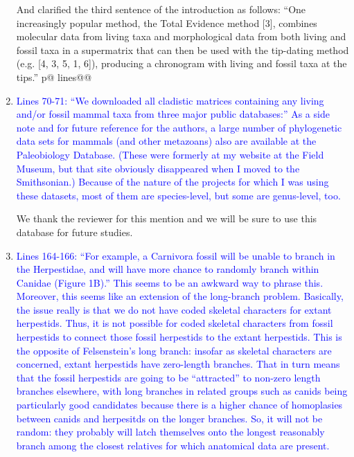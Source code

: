 \documentclass[12pt,letterpaper]{article}
\begin{document}
\begin{enumerate}
And clarified the third sentence of the introduction as follows:
``One increasingly popular method, the Total Evidence method [3], combines molecular data from living taxa and morphological data from both living and fossil taxa in a supermatrix that can then be used with the tip-dating method (e.g. [4, 3, 5, 1, 6]), producing a chronogram with living and fossil taxa at the tips.'' p@ lines@@

\item{\textcolor{blue}{Lines 70-71: ``We downloaded all cladistic matrices containing any living and/or fossil mammal  taxa from three major public databases:''
As a side note and for future reference for the authors, a large number of phylogenetic data sets for mammals (and other metazoans) also are available at the Paleobiology Database.
(These were formerly at my website at the Field Museum, but that site obviously disappeared when I moved to the Smithsonian.)
Because of the nature of the projects for which I was using these datasets, most of them are species-level, but some are genus-level, too.}}

We thank the reviewer for this mention and we will be sure to use this database for future studies.

\item{\textcolor{blue}{Lines 164-166: ``For example, a Carnivora fossil will be unable to branch in the Herpestidae, and will have more chance to randomly branch within Canidae (Figure 1B).'' 
This seems to be an awkward way to phrase this.
Moreover, this seems like an extension of the long-branch problem.
Basically, the issue really is that we do not have coded skeletal characters for extant herpestids.
Thus, it is not possible for coded skeletal characters from fossil herpestids to connect those fossil herpestids to the extant herpestids.
This is the opposite of Felsenstein's long branch: insofar as skeletal characters are concerned, extant herpestids have zero-length branches.
That in turn means that the fossil herpestids are going to be ``attracted'' to non-zero length branches elsewhere, with long branches in related groups such as canids being particularly good candidates because there is a higher chance of homoplasies between canids and herpesitds on the longer branches.
So, it will not be random: they probably will latch themselves onto the longest reasonably branch among the closest relatives for which anatomical data are present.}}


\end{enumerate}
\end{document}
